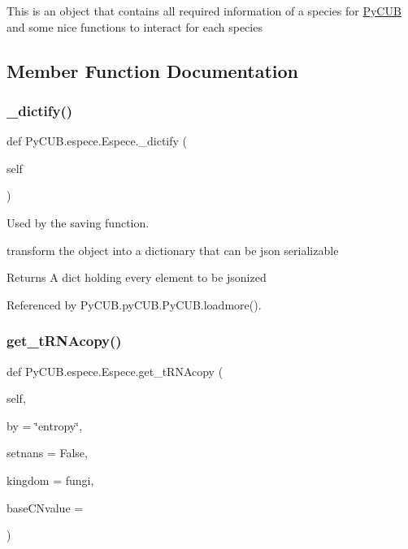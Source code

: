 This is an object that contains all required information of a species for \mbox{\hyperlink{namespace_py_c_u_b}{Py\+C\+UB}} and some nice functions to interact for each species 

\subsection{Member Function Documentation}
\mbox{\label{class_py_c_u_b_1_1espece_1_1_espece_a4edfabc363a5d4be437afb94f5d03368}} 
\subsubsection{\texorpdfstring{\+\_\+dictify()}{\_dictify()}}
{\footnotesize\ttfamily def Py\+C\+U\+B.\+espece.\+Espece.\+\_\+dictify (\begin{DoxyParamCaption}\item[{}]{self }\end{DoxyParamCaption})\hspace{0.3cm}{\ttfamily [private]}}



Used by the saving function. 

transform the object into a dictionary that can be json serializable

\begin{DoxyReturn}{Returns}
A dict holding every element to be jsonized 
\end{DoxyReturn}


Referenced by Py\+C\+U\+B.\+py\+C\+U\+B.\+Py\+C\+U\+B.\+loadmore().

\mbox{\label{class_py_c_u_b_1_1espece_1_1_espece_afa35655bb969cbc02456aa74228a1b8d}} 
\subsubsection{\texorpdfstring{get\+\_\+t\+R\+N\+Acopy()}{get\_tRNAcopy()}}
{\footnotesize\ttfamily def Py\+C\+U\+B.\+espece.\+Espece.\+get\+\_\+t\+R\+N\+Acopy (\begin{DoxyParamCaption}\item[{}]{self,  }\item[{}]{by = {\ttfamily \char`\"{}entropy\char`\"{}},  }\item[{}]{setnans = {\ttfamily False},  }\item[{}]{kingdom = {\ttfamily \textquotesingle{}fungi\textquotesingle{}},  }\item[{}]{base\+C\+Nvalue = {} }\end{DoxyParamCaption})}



